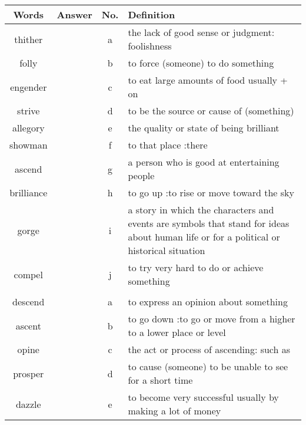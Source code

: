 \documentclass[a4paper]{article}
\begin{document}
\begin{center}
\begin{tabular}{|c|c|c|m{}|}
\hline
Words & Answer & No. & Definition \\
\hline
thither & & a &  the lack of good sense or judgment: foolishness \\
\hline
folly & & b &  to force (someone) to do something \\
\hline
engender & & c &  to eat large amounts of food usually + on \\
\hline
strive & & d &  to be the source or cause of (something) \\
\hline
allegory & & e &  the quality or state of being brilliant \\
\hline
showman & & f &  to that place :there \\
\hline
ascend & & g &  a person who is good at entertaining people\\
\hline
brilliance & & h &  to go up :to rise or move toward the sky \\
\hline
gorge & & i &  a story in which the characters and events are symbols that stand for ideas about human life or for a political or historical situation \\
\hline
compel & & j &  to try very hard to do or achieve something \\
\hline
 & & & \\
\hline
descend & & a &  to express an opinion about something \\
\hline
ascent & & b &  to go down :to go or move from a higher to a lower place or level \\
\hline
opine & & c &  the act or process of ascending: such as\\
\hline
prosper & & d &  to cause (someone) to be unable to see for a short time \\
\hline
dazzle & & e &  to become very successful usually by making a lot of money \\
\hline
\end{tabular}
\end{center}
\end{document}
